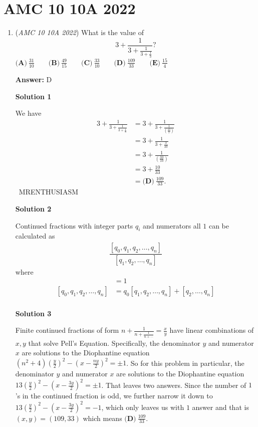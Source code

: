 \section{AMC 10 10A 2022}
        \begin{enumerate}
        	\item (\textit{AMC 10 10A 2022}) What is the value of 
 \[3+\frac{1}{3+\frac{1}{3+\frac13}}?\]
$\textbf{(A)}\ \frac{31}{10}\qquad\textbf{(B)}\ \frac{49}{15}\qquad\textbf{(C)}\ \frac{33}{10}\qquad\textbf{(D)}\ \frac{109}{33}\qquad\textbf{(E)}\ \frac{15}{4}$

 \textbf{Answer: }D



\textbf{Solution 1}

We have 
 \begin{align*} 3+\frac{1}{3+\frac{1}{3+\frac13}} &= 3+\frac{1}{3+\frac{1}{\left(\frac{10}{3}\right)}} \\ &= 3+\frac{1}{3+\frac{3}{10}} \\ &= 3+\frac{1}{\left(\frac{33}{10}\right)} \\ &= 3+\frac{10}{33} \\ &= \boxed{\textbf{(D)}\ \frac{109}{33}}. \end{align*}
~MRENTHUSIASM

 



\textbf{Solution 2}

Continued fractions with integer parts $q_i$ and numerators all $1$ can be calculated as 
 \begin{align*} \dfrac{[q_0,q_1,q_2,\ldots,q_n]}{[q_1,q_2,\ldots,q_n]} \end{align*}
where
 \begin{align*} []&=1 \\ [q_0,q_1,q_2,\ldots,q_n]&=q_0[q_1,q_2,\ldots,q_n]+[q_2,\ldots,q_n]\\ \end{align*}





\textbf{Solution 3}

Finite continued fractions of form $n+\frac{1}{n+\frac{1}{n+\cdots}}=\frac{x}{y}$ have linear combinations of $x, y$ that solve Pell's Equation. Specifically, the denominator $y$ and numerator $x$ are solutions to the Diophantine equation $(n^2+4)\left(\frac{y}{2}\right)^2-\left(x-\frac{ny}{2}\right)^2=\pm{1}$. So for this problem in particular, the denominator $y$ and numerator $x$ are solutions to the Diophantine equation $13\left(\frac{y}{2}\right)^2-\left(x-\frac{3y}{2}\right)^2=\pm{1}$. That leaves two answers. Since the number of $1$'s in the continued fraction is odd, we further narrow it down to $13\left(\frac{y}{2}\right)^2-\left(x-\frac{3y}{2}\right)^2=-1$, which only leaves us with $1$ answer and that is $(x,y)=(109,33)$ which means $\boxed{\textbf{(D)}\ \frac{109}{33}}$. 


\end{enumerate}

